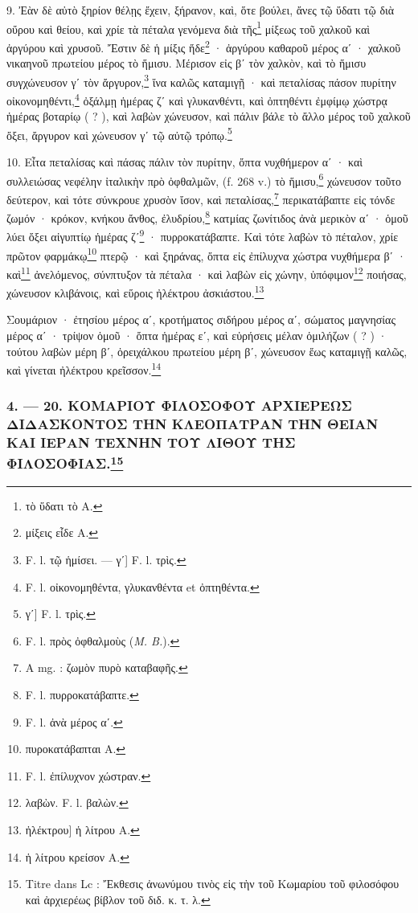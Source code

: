 \documentclass[a4paper, 11pt, oneside, polutonikogreek, french]{article}
\begin{document}
9. Ἐὰν δὲ αὐτὸ ξηρίον θέλῃς ἔχειν, ξήρανον, καὶ, ὅτε βούλει, ἄνες τῷ ὕδατι τῷ διὰ οὔρου καὶ θείου, καὶ χρίε τὰ πέταλα γενόμενα διὰ τῆς\footnote{τὸ ὕδατι τὸ A.} μίξεως τοῦ χαλκοῦ καὶ ἀργύρου καὶ χρυσοῦ. Ἔστιν δὲ ἡ μίξις ἥδε\footnote{μίξεις εἶδε A.} · ἀργύρου καθαροῦ μέρος αʹ · χαλκοῦ νικαηνοῦ πρωτείου μέρος τὸ ἥμισυ. Μέρισον εἰς βʹ τὸν χαλκὸν, καὶ τὸ ἥμισυ συγχώνευσον γʹ τὸν ἄργυρον,\footnote{F. l. τῷ ἡμίσει. --- γʹ] F. l. τρὶς.} ἵνα καλῶς καταμιγῇ · καὶ πεταλίσας πάσον πυρίτην οἰκονομηθέντι,\footnote{F. l. οἰκονομηθέντα, γλυκανθέντα et ὀπτηθέντα.} ὀξάλμῃ ἡμέρας ζʹ καὶ γλυκανθέντι, καὶ ὀπτηθέντι ἐμφίμῳ χώστρᾳ ἡμέρας βοταρίῳ ( ? ), καὶ λαβὼν χώνευσον, καὶ πάλιν βάλε τὸ ἄλλο μέρος τοῦ χαλκοῦ ὄξει, ἄργυρον καὶ χώνευσον γʹ τῷ αὐτῷ τρόπῳ.\footnote{γʹ] F. l. τρὶς.}

10. Εἶτα πεταλίσας καὶ πάσας πάλιν τὸν πυρίτην, ὄπτα νυχθήμερον αʹ · καὶ συλλειώσας νεφέλην ἰταλικὴν πρὸ ὀφθαλμῶν, (f. 268 v.) τὸ ἥμισυ,\footnote{F. l. πρὸς ὀφθαλμοὺς (\emph{M. B.}).} χώνευσον τοῦτο δεύτερον, καὶ τότε σύνκρουε χρυσὸν ἴσον, καὶ πεταλίσας,\footnote{A mg. : ζωμὸν πυρὸ καταβαφῆς.} περικατάβαπτε εἰς τόνδε ζωμόν · κρόκον, κνήκου ἄνθος, ἐλυδρίου,\footnote{F. l. πυρροκατάβαπτε.} κατμίας ζωνίτιδος ἀνὰ μερικὸν αʹ · ὁμοῦ λύει ὄξει αἰγυπτίῳ ἡμέρας ζʹ\footnote{F. l. ἀνὰ μέρος αʹ.} · πυρροκατάβαπτε. Καὶ τότε λαβὼν τὸ πέταλον, χρίε πρῶτον φαρμάκῳ\footnote{πυροκατάβαπται A.} πτερῷ · καὶ ξηράνας, ὄπτα εἰς ἐπίλυχνα χώστρα νυχθήμερα βʹ · καὶ\footnote{F. l. ἐπίλυχνον χώστραν.} ἀνελόμενος, σύνπτυξον τὰ πέταλα · καὶ λαβὼν εἰς χώνην, ὑπόφιμον\footnote{λαβὼν. F. l. βαλὼν.} ποιήσας, χώνευσον κλιβάνοις, καὶ εὕροις ἠλέκτρου ἀσκιάστου.\footnote{ἠλέκτρου] ἡ λίτρου A.}

Σουμάριον · ἐτησίου μέρος αʹ, κροτήματος σιδήρου μέρος αʹ, σώματος μαγνησίας μέρος αʹ · τρίψον ὁμοῦ · ὄπτα ἡμέρας εʹ, καὶ εὑρήσεις μέλαν ὁμιλήζων ( ? ) · τούτου λαβὼν μέρη βʹ, ὀρειχάλκου πρωτείου μέρη βʹ, χώνευσον ἕως καταμιγῇ καλῶς, καὶ γίνεται ἠλέκτρου κρεῖσσον.\footnote{ἡ λίτρου κρείσον A.}

\bigskip
\centerline{\EightStarTaper}
\centerline{\EightStarTaper\EightStarTaper}
\bigskip

\subsubsection[4. --- 20. ΚΟΜΑΡΙΟΥ ΦΙΛΟΣΟΦΟΥ ΑΡΧΙΕΡΕΩΣ ΔΙΔΑΣΚΟΝΤΟΣ ΤΗΝ ΚΛΕΟΠΑΤΡΑΝ ΤΗΝ ΘΕΙΑΝ ΚΑΙ ΙΕΡΑΝ ΤΕΧΝΗΝ ΤΟΥ ΛΙΘΟΥ ΤΗΣ ΦΙΛΟΣΟΦΙΑΣ.]{4. --- 20. ΚΟΜΑΡΙΟΥ ΦΙΛΟΣΟΦΟΥ ΑΡΧΙΕΡΕΩΣ ΔΙΔΑΣΚΟΝΤΟΣ ΤΗΝ ΚΛΕΟΠΑΤΡΑΝ ΤΗΝ ΘΕΙΑΝ ΚΑΙ ΙΕΡΑΝ ΤΕΧΝΗΝ ΤΟΥ ΛΙΘΟΥ ΤΗΣ ΦΙΛΟΣΟΦΙΑΣ.\footnote{Titre dans Lc : Ἔκθεσις ἀνωνύμου τινὸς εἰς τὴν τοῦ Κωμαρίου τοῦ φιλοσόφου καὶ ἀρχιερέως βίβλον τοῦ διδ. κ. τ. λ.}}
\end{document}
